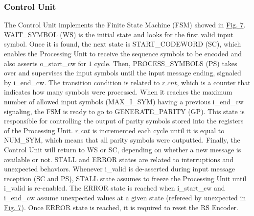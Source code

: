 \documentclass[conference]{IEEEtran}
\begin{document}
\subsubsection{Control Unit}
The Control Unit implements the Finite State Machine (FSM) showed in \hyperref[fig:fig7]{Fig. 7}. WAIT\_SYMBOL (WS) is the initial state and looks for the first valid input symbol. Once it is found, the next state is START\_CODEWORD (SC), which enables the Processing Unit to receive the sequence symbols to be encoded and also asserts o\_start\_cw for $1$ cycle. Then, PROCESS\_SYMBOLS (PS) takes over and supervises the input symbols until the input message ending, signaled by i\_end\_cw. The transition condition is related to $r\_cnt$, which is a counter that indicates how many symbols were processed. When it reaches the maximum number of allowed input symbols (MAX\_I\_SYM) having a previous i\_end\_cw signaling, the FSM is ready to go to GENERATE\_PARITY (GP). This state is responsible for controlling the output of parity symbols stored into the registers of the Processing Unit. $r\_cnt$ is incremented each cycle until it is equal to NUM\_SYM, which means that all parity symbols were outputted. Finally, the Control Unit will return to WS or SC, depending on whether a new message is available or not. STALL and ERROR states are related to interruptions and unexpected behaviors. Whenever i\_valid is de-asserted during input message reception (SC and PS), STALL state assumes to freeze the Processing Unit until i\_valid is re-enabled. The ERROR state is reached when i\_start\_cw and i\_end\_cw assume unexpected values at a given state (refereed by \*unexpected\* in \hyperref[fig:fig7]{Fig. 7}). Once ERROR state is reached, it is required to reset the RS Encoder. 


\end{document}
